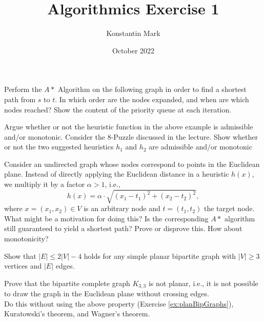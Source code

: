\documentclass{article}
\title{Algorithmics Exercise 1}
\author{Konstantin Mark}
\date{October 2022}
\begin{document}
\maketitle

\begin{exercise}[$A*$ Algorithm]
    Perform the $A*$ Algorithm on the following graph in order to find a shortest path from $s$ to $t$. In which order are the nodes expanded, and when are which nodes reached? Show the content of the priority queue at each iteration.
\end{exercise}

\begin{exercise}
    Argue whether or not the heuristic function in the above example is admissible and/or monotonic. Consider the $8$-Puzzle discussed in the lecture. Show whether or not the two suggested heuristics $h_1$ and $h_2$ are admissible and/or monotonic
\end{exercise}

\begin{exercise}
    Consider an undirected graph whose nodes correspond to points in the Euclidean plane. Instead of directly applying the Euclidean distance in a heuristic $h(x)$, we multiply it by a factor $\alpha>1$, i.e.,
    \begin{equation*}
        h(x) = \alpha \cdot \sqrt{
            (x_1-t_1)^2+(x_2-t_2)^2
        },   
    \end{equation*}
    where $x= (x_1,x_2)\in V$ is an arbitrary node and $t= (t_1,t_2)$ the target node. What might be a motivation for doing this? Is the corresponding $A*$ algorithm still guaranteed to yield a shortest path? Prove or disprove this. How about monotonicity?
\end{exercise}

\begin{exercise}\label{ex:planBipGraphs}
    Show that $|E|\leq 2|V| - 4$ holds for any simple planar bipartite graph with $|V|\geq 3$ vertices and $|E|$ edges.
\end{exercise}

\begin{exercise}
    Prove that the bipartite complete graph $K_{3,3}$ is not planar, i.e., it is not possible to draw the graph in the Euclidean plane without crossing edges.\\
    Do this without using the above property (Exercise \ref{ex:planBipGraphs}), Kuratowski's theorem, and Wagner's theorem.
\end{exercise}
\end{document}
